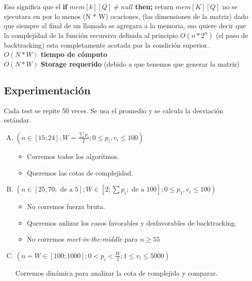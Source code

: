 \documentclass[fleqn, 11pt]{article}
\begin{document}
Eso significa que el \textbf{if} $mem[k][Q] \neq null$ \textbf{then;} return $mem[K][Q]$ no se ejecutara en por lo menos (N * W) ocaciones, (las dimensiones de la matriz) dado que siempre al final de un llamado se agregara a la memoria, eso quiere decir que la complejidad de la función recursiva definida al principio $O(n*2^n)$ (el paso de backtracking) esta completamente acotada por la condición superior. \\

\small $O(N * W)$ \textbf{tiempo de cómputo} \\
\small $O(N * W)$ \textbf{Storage requerido} (debido a que tenemos que generar la matriz) \\

\subsection{Experimentación}

Cada test se repite 50 veces. Se usa el promedio y se calcula la desviación
estándar.

\begin{enumerate}[A.]
\item $(n \in [15; 24];
	W=\frac{\sum p_i}{2};
	0 \leq p_i, v_i \leq 100)$

\begin{itemize}
\item Corremos todos los algoritmos.
\item Queremos las cotas de complejidad.
\end{itemize}

\item $(n \in [25; 70; \text{ de a } 5];
	W \in [2; \sum p_i; \text{ de a } 100];
	0 \leq p_1, v_i \leq 100)$

\begin{itemize}
\item No corremos fuerza bruta.
\item Queremos anlizar los casos favorables y desfavorables de backtracking.
\item No corremos \emph{meet-in-the-middle} para $n \geq 55$
\end{itemize}

\item $(n = W \in [100; 1000];
        0 < p_i < \frac{W}{2};
        1 \leq v_i \leq 5000)$

Corremos dinámica para analizar la cota de complejida y comparar.
\end{enumerate}
\end{document}

